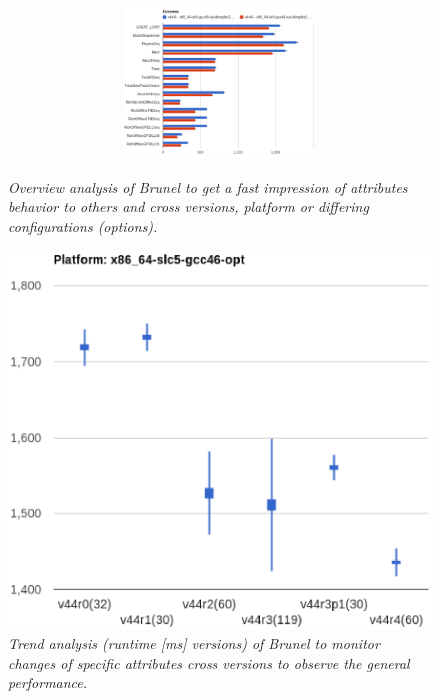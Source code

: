 \documentclass[a4paper]{jpconf}
\begin{document}
\begin{figure}[t]
\begin{minipage}[t]{0.34\textwidth}
\includegraphics[width=1\textwidth, height=4cm]{figures/brunel_overview_analysis.eps}
\caption{\small \textit{Overview analysis of Brunel to get a fast impression of attributes behavior to others and cross versions, platform or differing configurations (options).}}
\label{fig:brunel_overview}
\end{minipage}\hspace{1pc}
\begin{minipage}[t]{0.29\textwidth}
\includegraphics[scale=0.33]{figures/brunel_trend_analysis.eps}
\caption{\small \textit{Trend analysis (runtime [ms] \texttimes versions) of Brunel to monitor changes of specific attributes cross versions to observe the general performance.}}
\label{fig:brunel_trend}
\end{minipage}\hspace{1pc}
\begin{minipage}[t]{0.29\textwidth}

\end{minipage}
\end{figure}
\end{document}
